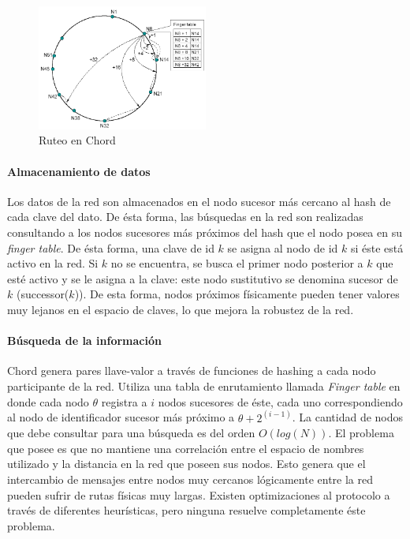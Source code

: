 \label{sec:chord}
\begin{figure}
\center
\includegraphics[width=0.5\textwidth]{img/chord-search}
\caption{Ruteo en Chord}
\label{fig:p2p_estructured_chord_search}
\end{figure}

\paragraph{Almacenamiento de datos}
 Los datos de la red son almacenados en el nodo sucesor
más cercano al hash de cada clave del dato. De ésta forma, las búsquedas en la red son
realizadas consultando a los nodos sucesores más próximos del hash que el nodo
posea en su \textit{finger table}.
De ésta forma, una clave de id $k$ se asigna al nodo de id $k$ si éste está activo en la
red. Si $k$ no se encuentra, se busca el primer nodo posterior a $k$ que esté activo y se le asigna a la
clave: este nodo sustitutivo se denomina sucesor de $k$ (successor($k$)). De
esta forma, nodos próximos físicamente pueden tener valores muy lejanos en el
espacio de claves, lo que mejora la robustez de la red.

\paragraph{Búsqueda de la información}
Chord genera pares llave-valor a través de funciones de
hashing a cada nodo participante de la red. Utiliza una tabla de enrutamiento
llamada \textit{Finger table} en donde cada nodo $\theta$ registra a $i$ nodos sucesores
de éste, cada uno correspondiendo al nodo de identificador sucesor más próximo a
$\theta + 2^(i-1)$.
 La cantidad de nodos que debe consultar para
una búsqueda es del orden $O(log(N))$. El problema que posee es que no mantiene una correlación entre el
espacio de nombres utilizado y la distancia en la red que poseen sus nodos.
Esto genera que el intercambio de mensajes entre nodos muy cercanos lógicamente
entre la red pueden sufrir de rutas físicas muy largas. Existen 
optimizaciones al protocolo a través de diferentes heurísticas,
pero ninguna resuelve completamente éste problema.

